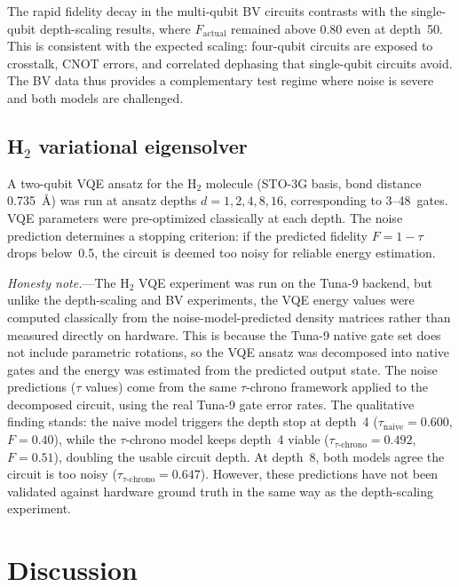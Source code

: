 \documentclass[prl,twocolumn,superscriptaddress,longbibliography]{revtex4-2}
\begin{document}
The rapid fidelity decay in the multi-qubit BV circuits contrasts with the single-qubit depth-scaling results, where $F_{\text{actual}}$ remained above 0.80 even at depth~50. This is consistent with the expected scaling: four-qubit circuits are exposed to crosstalk, CNOT errors, and correlated dephasing that single-qubit circuits avoid. The BV data thus provides a complementary test regime where noise is severe and both models are challenged.

\subsection{H$_2$ variational eigensolver}

A two-qubit VQE ansatz for the H$_2$ molecule (STO-3G basis, bond distance 0.735~\AA) was run at ansatz depths $d = 1, 2, 4, 8, 16$, corresponding to 3--48~gates. VQE parameters were pre-optimized classically at each depth. The noise prediction determines a stopping criterion: if the predicted fidelity $F = 1 - \tau$ drops below~0.5, the circuit is deemed too noisy for reliable energy estimation.

\emph{Honesty note.}---The H$_2$ VQE experiment was run on the Tuna-9 backend, but unlike the depth-scaling and BV experiments, the VQE energy values were computed classically from the noise-model-predicted density matrices rather than measured directly on hardware. This is because the Tuna-9 native gate set does not include parametric rotations, so the VQE ansatz was decomposed into native gates and the energy was estimated from the predicted output state. The noise predictions ($\tau$ values) come from the same $\tau$-chrono framework applied to the decomposed circuit, using the real Tuna-9 gate error rates. The qualitative finding stands: the naive model triggers the depth stop at depth~4 ($\tau_{\text{naive}} = 0.600$, $F = 0.40$), while the $\tau$-chrono model keeps depth~4 viable ($\tau_{\tau\text{-chrono}} = 0.492$, $F = 0.51$), doubling the usable circuit depth. At depth~8, both models agree the circuit is too noisy ($\tau_{\tau\text{-chrono}} = 0.647$). However, these predictions have not been validated against hardware ground truth in the same way as the depth-scaling experiment.

\section{Discussion}
\end{document}
